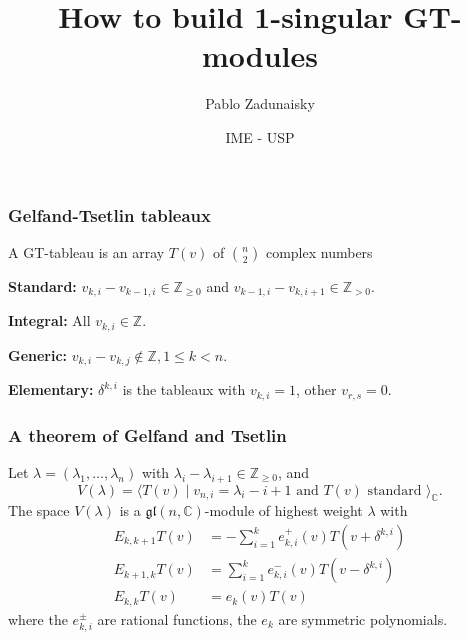 \documentclass[smaller,usepdftitle=false]{beamer}
\title[]{How to build 1-singular GT-modules}
\author[]{Pablo Zadunaisky}
\date{IME - USP}
\newcommand\CC{\mathbb C}
\newcommand\ZZ{\mathbb Z}
\newcommand\gl{\mathfrak{gl}}
\def\pausa{\pause \bigskip}
\begin{document}

\begin{frame}
\titlepage
\end{frame}

\begin{frame}
\frametitle{Gelfand-Tsetlin tableaux}
A GT-tableau is an array $T(v)$ of $\binom{n}{2}$ complex numbers

\bigskip


\pausa

\textbf{Standard:} $v_{k,i} - v_{k-1,i} \in \ZZ_{\geq 0}$ and $v_{k-1,i} - 
v_{k,i+1} \in \ZZ_{>0}$.

\textbf{Integral:} All $v_{k,i} \in \ZZ$.

\textbf{Generic:} $v_{k,i} - v_{k,j} \notin \ZZ, 1 \leq k < n$.

\textbf{Elementary:} $\delta^{k,i}$ is the tableaux with $v_{k,i} = 1$, other 
$v_{r,s} = 0$.
\end{frame}

\begin{frame}
\frametitle{A theorem of Gelfand and Tsetlin}

\begin{Theorem}
Let $\lambda = (\lambda_1, \ldots, \lambda_n)$ with $\lambda_i - \lambda_{i+1} 
\in \ZZ_{\geq 0}$, and
$$V(\lambda) = \langle T(v) \mid v_{n,i} = \lambda_i - i + 1 \mbox{ and }
T(v) \mbox{ standard }\rangle_\CC.$$ 
The space $V(\lambda)$ is a $\gl(n,\CC)$-module of highest weight $\lambda$
with
\begin{align*}
E_{k,k+1} T(v) &= - \sum_{i=1}^k e^+_{k,i}(v) T(v+\delta^{k,i}) \\
E_{k+1,k} T(v) &= \sum_{i=1}^k e^-_{k,i}(v) T(v-\delta^{k,i}) \\
E_{k,k} T(v) &= e_k(v) T(v)
\end{align*}
where the $e^\pm_{k,i}$ are rational functions, the $e_k$ are symmetric 
polynomials.
\end{Theorem}
\end{frame}
\end{document}
